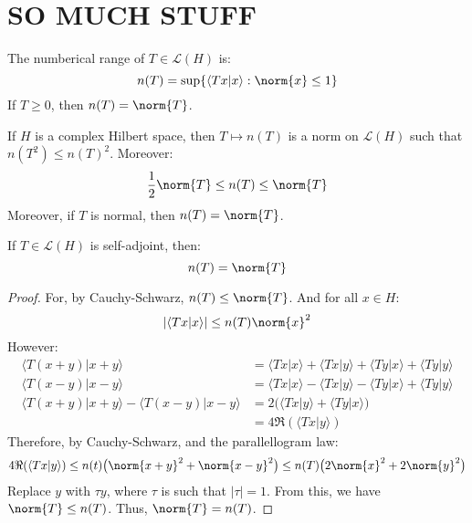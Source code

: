 \chapter{SO MUCH STUFF}
    The numberical range of $T\in\mathcal{L}(H)$ is:
    \begin{equation}
        n(T)=\sup\{\langle{Tx|x}\rangle:\norm{x}\leq{1}\}
    \end{equation}
    If $T\geq{0}$, then $n(T)=\norm{T}$.
    \begin{theorem}
        If $H$ is a complex Hilbert space, then
        $T\mapsto{n}(T)$ is a norm on $\mathcal{L}(H)$ such
        that $n(T^{2})\leq{n}(T)^{2}$. Moreover:
        \begin{equation}
            \frac{1}{2}\norm{T}\leq{n}(T)
            \leq\norm{T}
        \end{equation}
        Moreover, if $T$ is normal, then $n(T)=\norm{T}$.
    \end{theorem}
    \begin{theorem}
        If $T\in\mathcal{L}(H)$ is self-adjoint, then:
        \begin{equation}
            n(T)=\norm{T}
        \end{equation}
    \end{theorem}
    \begin{proof}
        For, by Cauchy-Schwarz, $n(T)\leq\norm{T}$. And for
        all $x\in{H}$:
        \begin{equation}
            |\langle{Tx|x}\rangle|\leq{n}(T)\norm{x}^{2}
        \end{equation}
        However:
        \begin{subequations}
            \begin{align}
                \langle{T(x+y)|x+y}\rangle
                &=\langle{Tx|x}\rangle+\langle{Tx|y}\rangle
                +\langle{Ty|x}\rangle+\langle{Ty|y}\rangle\\
                \langle{T(x-y)|x-y}\rangle
                &=\langle{Tx|x}\rangle-\langle{Tx|y}\rangle
                -\langle{Ty|x}\rangle+\langle{Ty|y}\rangle\\
                \langle{T(x+y)|x+y}\rangle
                -\langle{T(x-y)|x-y}\rangle
                &=2\big(\langle{Tx|y}\rangle
                    +\langle{Ty|x}\rangle\big)\\
                &=4\Re(\langle{Tx|y}\rangle)
            \end{align}
        \end{subequations}
        Therefore, by Cauchy-Schwarz, and the parallellogram
        law:
        \begin{equation}
            4\Re(\langle{Tx|y}\rangle)\leq
            n(t)\big(\norm{x+y}^{2}+\norm{x-y}^{2}\big)
            \leq{n}(T)\big(2\norm{x}^{2}+2\norm{y}^{2}\big)
        \end{equation}
        Replace $y$ with $\tau{y}$, where $\tau$ is such that
        $|\tau|=1$. From this, we have $\norm{T}\leq{n}(T)$.
        Thus, $\norm{T}=n(T)$.
    \end{proof}
